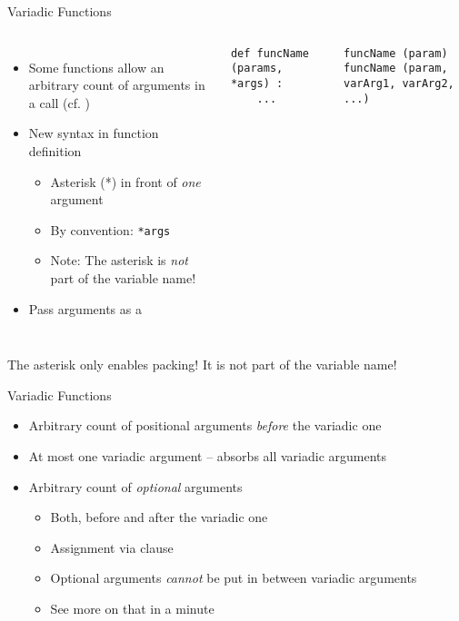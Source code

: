 
\begin{frame}[fragile]{Variadic Functions}
%
\vspace{-15pt}
\begin{columns}[t]
\begin{itemize}
\item Some functions allow an arbitrary count of arguments in a call (cf. )
\item New syntax in function definition
	\begin{itemize}
	\item Asterisk (*) in front of \emph{one} argument
	\item By convention: \texttt{*args}
	\item Note: The asterisk is \emph{not} part of the variable name!
	\end{itemize}
\item Pass arguments as a 
\end{itemize}
%
\begin{codebox}
\begin{verbatim}
def funcName (params, *args) :
    ...
\end{verbatim}
\end{codebox}
%
\begin{codebox}
\begin{verbatim}
funcName (param)
funcName (param, varArg1, varArg2, ...)
\end{verbatim}
\end{codebox}
\end{columns}
%
\begin{hintbox}
\small
The asterisk only enables packing! It is not part of the variable name!
\end{hintbox}
%
\end{frame}


\begin{frame}{Variadic Functions}
%
\begin{itemize}
\item Arbitrary count of positional arguments \emph{before} the variadic one
\item At most one variadic argument -- absorbs all variadic arguments
\item Arbitrary count of \emph{optional} arguments
	\begin{itemize}
	\item Both, before and after the variadic one
	\item Assignment via clause 
	\item Optional arguments \emph{cannot} be put in between variadic arguments
	\item See more on that in a minute
	\end{itemize}
\end{itemize}
%
\end{frame}

